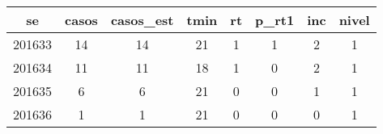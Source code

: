\begin{tabular}{c|ccccccc}
  \hline
se & casos & casos\_est & tmin & rt & p\_rt1 & inc & nivel \\ 
  \hline
201633 & 14 & 14 & 21 & 1 & 1 & 2 & 1 \\ 
  201634 & 11 & 11 & 18 & 1 & 0 & 2 & 1 \\ 
  201635 & 6 & 6 & 21 & 0 & 0 & 1 & 1 \\ 
  201636 & 1 & 1 & 21 & 0 & 0 & 0 & 1 \\ 
   \hline
\end{tabular}
